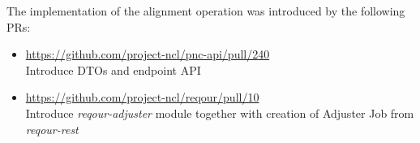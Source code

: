 \documentclass[../main.tex]{subfiles}
\begin{document}
The implementation of the alignment operation was introduced by the following PRs:
\begin{itemize}
    \item \url{https://github.com/project-ncl/pnc-api/pull/240}\\
    Introduce DTOs and endpoint API

    \item \url{https://github.com/project-ncl/reqour/pull/10}\\
    Introduce \textit{reqour-adjuster} module together with creation of Adjuster Job from \textit{reqour-rest}
\end{itemize}
\end{document}
